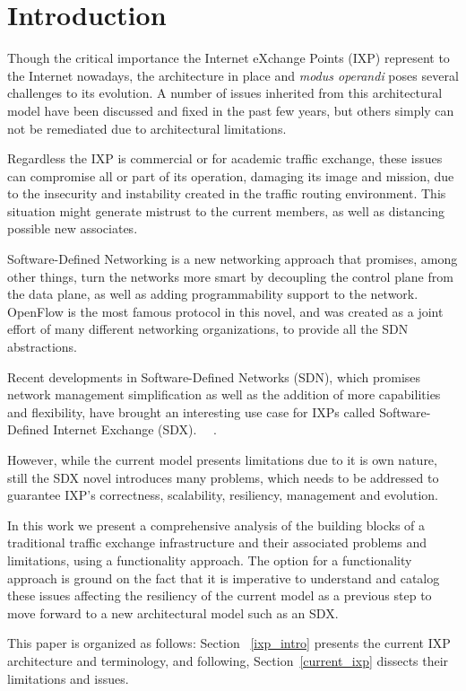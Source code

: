 \documentclass[conference]{IEEEtran/IEEEtran}
\begin{document}
\section{Introduction}
\label{introduction}
Though the critical importance the Internet eXchange Points (IXP) represent to the Internet nowadays, the architecture in place and \textit{modus operandi} poses several challenges to its evolution. A number of issues inherited from this architectural model have been discussed and fixed in the past few years, but others simply can not be remediated due to architectural limitations. 

Regardless the IXP is commercial or for academic traffic exchange, these issues can compromise all or part of its operation, damaging its image and mission, due to the insecurity and instability created in the traffic routing environment. This situation might generate mistrust to the current members, as well as distancing possible new associates.

Software-Defined Networking is a new networking approach that promises, among other things, turn the networks more smart by decoupling the control plane from the data plane, as well as adding programmability support to the network. OpenFlow is the most famous protocol in this novel, and was created as a joint effort of many different networking organizations, to provide all the SDN abstractions.

Recent developments in Software-Defined Networks (SDN), which promises network management simplification as well as the addition of more capabilities and flexibility, have brought an interesting use case for IXPs called Software-Defined Internet Exchange (SDX). ~\cite{gupta2015sdx}~\cite{gupta2016industrial}. 

However, while the current model presents limitations due to it is own nature, still the SDX novel introduces many problems, which needs to be addressed to guarantee IXP's correctness, scalability, resiliency, management and evolution.

In this work we present a comprehensive analysis of the building blocks of a traditional traffic exchange infrastructure and their associated problems and limitations, using a functionality approach. The option for a functionality approach is ground on the fact that it is imperative to understand and catalog these issues affecting the resiliency of the current model as a previous step to move forward to a new architectural model such as an SDX. 

This paper is organized as follows: Section ~\ref{ixp_intro} presents the current IXP architecture and terminology, and following, Section~\ref{current_ixp} dissects their limitations and issues.
\end{document}
